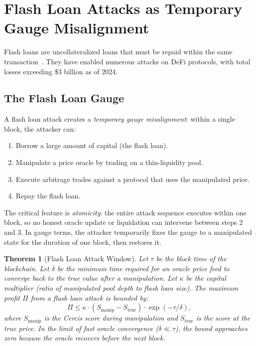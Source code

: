 \documentclass[12pt,a4paper]{article}
\newtheorem{theorem}{Theorem}[section]
\theoremstyle{remark}
\newcommand{\Cercis}{\textsf{Cercis}}
\begin{document}
\section{Flash Loan Attacks as Temporary Gauge Misalignment}
\label{sec:flashloan}

Flash loans are uncollateralized loans that must be repaid within the same
transaction~\cite{qin2021attracting}. They have enabled numerous attacks on
DeFi protocols, with total losses exceeding \$3 billion as of 2024.

\subsection{The Flash Loan Gauge}

A flash loan attack creates a \emph{temporary gauge misalignment}: within a
single block, the attacker can:
\begin{enumerate}
\item Borrow a large amount of capital (the flash loan).
\item Manipulate a price oracle by trading on a thin-liquidity pool.
\item Execute arbitrage trades against a protocol that uses the manipulated
price.
\item Repay the flash loan.
\end{enumerate}

The critical feature is \emph{atomicity}: the entire attack sequence executes
within one block, so no honest oracle update or liquidation can intervene
between steps 2 and 3. In gauge terms, the attacker temporarily fixes the gauge
to a manipulated state for the duration of one block, then restores it.

\begin{theorem}[Flash Loan Attack Window]
\label{thm:flash_window}
Let $\tau$ be the block time of the blockchain. Let $\delta$ be the minimum
time required for an oracle price feed to converge back to the true value after
a manipulation. Let $\kappa$ be the capital multiplier (ratio of manipulated
pool depth to flash loan size). The maximum profit $\Pi$ from a flash loan
attack is bounded by:
\begin{equation}
\Pi \leq \kappa \cdot \left( S_{\text{manip}} - S_{\text{true}} \right) \cdot
\exp(-\tau / \delta),
\label{eq:flash_bound}
\end{equation}
where $S_{\text{manip}}$ is the \Cercis{} score during manipulation and
$S_{\text{true}}$ is the score at the true price. In the limit of fast oracle
convergence ($\delta \ll \tau$), the bound approaches zero because the oracle
recovers before the next block.
\end{theorem}
\end{document}
